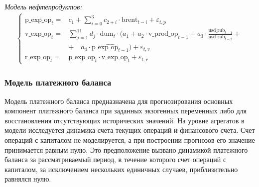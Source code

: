 \documentclass[a4paper, 14pt]{extarticle}
\newcommand{\lsum}{\sum\limits}
\begin{document}
\vspace{5mm}

\textit{Модель нефтепродуктов:}
\begin{align*} 
	\begin{cases}
		\text{p\_exp\_op}_t =&c_1 + \lsum_{i = 0}^{3}c_{2 + i} \cdot \text{brent}_{t-i} + \varepsilon_{t,p} \\
		\text{v\_exp\_op}_t =&\lsum_{j = 1}^{11} d_j \cdot \text{dum}_t \cdot (a_1 + a_2 \cdot \text{v\_prod\_op}_{t-1} + a_3 \cdot \frac{\text{usd\_rub}_{t-1}}{\text{usd\_rub}_{t-2}} + \\  
		&+ \quad a_4 \cdot \widehat{ \text{p\_exp\_op}_{t-1}}) + \varepsilon_{t,v} \\
		\text{r\_exp\_op}_t =&\text{p\_exp\_op}_t \cdot \text{v\_exp\_op}_t + \varepsilon_{t,r}
	\end{cases}
\end{align*}


\subsubsection*{Модель платежного баланса}

Модель платежного баланса предназначена для прогнозирования основных компонент платежного баланса при заданных экзогенных переменных либо для восстановления отсутствующих исторических значений.
На уровне агрегатов в модели исследуется динамика счета текущих операций и финансового счета.
Счет операций с капиталом не моделируется, а при построении прогнозов его значение принимается равным нулю.
Это предположение вызвано динамикой платежного баланса за рассматриваемый период, в течение которого счет операций с капиталом, за исключением нескольких единичных случаев, приблизительно равнялся нулю.
\end{document}
